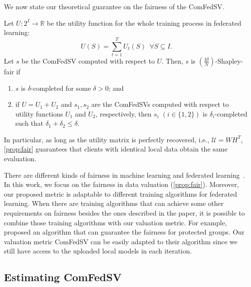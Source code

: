 We now state our theoretical guarantee on the fairness of the ComFedSV. 

\begin{theorem} \label{prop:fair}
    Let $U: 2^I \to \mathbb{R}$ be the utility function for the whole training process in federated learning: 
    \[U(S) = \sum_{t=1}^T U_t(S) \enspace \forall S \subseteq I.\]
    Let $s$ be the ComFedSV computed with respect to $U$.  Then, $s$ is $(\frac{4\delta}{N})$-Shapley-fair if
    \begin{enumerate}
        \item  $s$ is $\delta$-completed for some $\delta > 0$; and 
        \item if $U = U_1 + U_2$ and $s_1, s_2$ are the ComFedSVs computed with respect to utility functions $U_1$ and $U_2$, respectively, then $s_i$ $(i \in \{1,2\})$ is $\delta_i$-completed such that $\delta_1 + \delta_2 \leq \delta$. 
    \end{enumerate}
\end{theorem}

In particular, as long as the utility matrix is perfectly recovered, i.e., $\mathcal{U} = WH^T$, \autoref{prop:fair} guarantees that clients with identical local data obtain the same evaluation.

There are different kinds of fairness in machine learning and federated learning~\citep{zemel2013learning,donini2018empirical,li2019fair,lyu2020collaborative,chu2021fedfair}. In this work, we focus on the fairness in data valuation (\autoref{prop:fair}). Moreover, our proposed metric is adaptable to different training algorithms for federated learning. When there are training algorithms that can achieve some other requirements on fairness besides the ones described in the paper, it is possible to combine those training algorithms with our valuation metric. For example, \citet{chu2021fedfair} proposed an algorithm that can guarantee the fairness for protected groups. Our valuation metric ComFedSV can be easily adapted to their algorithm since we still have access to the uploaded local models in each iteration.

\subsection{Estimating ComFedSV} \label{sec:7-6-5}

